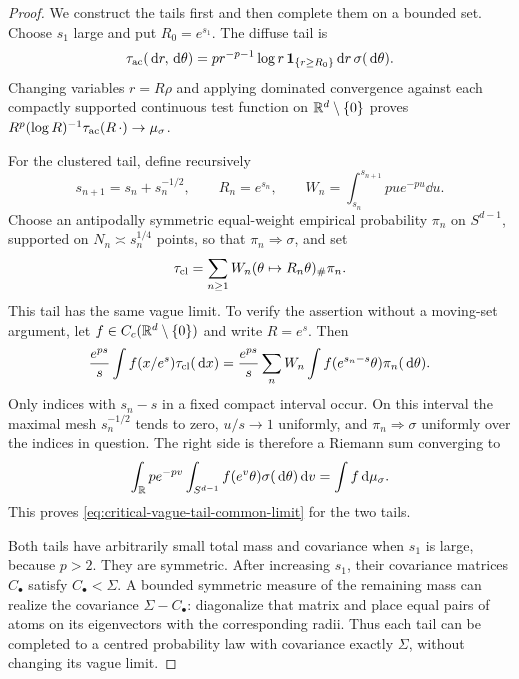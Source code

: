 \begin{proof}
We construct the tails first and then complete them on a bounded set.  Choose
\(s_1\) large and put \(R_0=e^{s_1}\).  The diffuse tail is
\begin{equation}\label{eq:critical-diffuse-tail-definition}
 \tau_{\rm ac}(\,\mathrm{d} r,\,\mathrm{d}\theta)
 =p r^{-p-1}\log r\,\mathbf1_{\{r\ge R_0\}}
   \,\mathrm{d} r\,\sigma(\,\mathrm{d}\theta).
\end{equation}
Changing variables \(r=R\rho\) and applying dominated convergence against
each compactly supported continuous test function on
\(\mathbb{R}^d\setminus\{0\}\) proves
\(R^p(\log R)^{-1}\tau_{\rm ac}(R\,\mathord\cdot)\to\mu_\sigma\).

For the clustered tail, define recursively
\[
 s_{n+1}=s_n+s_n^{-1/2},\qquad R_n=e^{s_n},\qquad
 W_n=\int_{s_n}^{s_{n+1}}pu e^{-pu}\dd u.
\]
Choose an antipodally symmetric equal-weight empirical probability
\(\pi_n\) on \(S^{d-1}\), supported on
\(N_n\asymp s_n^{1/4}\) points, so that \(\pi_n\Rightarrow\sigma\), and set
\begin{equation}\label{eq:critical-clustered-tail-definition}
 \tau_{\rm cl}=\sum_{n\ge1}W_n(\theta\mapsto R_n\theta)_\#\pi_n.
\end{equation}
This tail has the same vague limit.  To verify the assertion without a
moving-set argument, let \(f\in C_c(\mathbb{R}^d\setminus\{0\})\) and write
\(R=e^s\).  Then
\[
 \frac{e^{ps}}s\int f(x/e^s)\tau_{\rm cl}(\,\mathrm{d} x)
 =\frac{e^{ps}}s\sum_nW_n
   \int f(e^{s_n-s}\theta)\pi_n(\,\mathrm{d}\theta).
\]
Only indices with \(s_n-s\) in a fixed compact interval occur.  On this
interval the maximal mesh \(s_n^{-1/2}\) tends to zero, \(u/s\to1\)
uniformly, and \(\pi_n\Rightarrow\sigma\) uniformly over the indices in
question.  The right side is therefore a Riemann sum converging to
\[
 \int_{\mathbb{R}} pe^{-pv}\int_{S^{d-1}}f(e^v\theta)
 \sigma(\,\mathrm{d}\theta)\,\mathrm{d} v
 =\int f\,\mathrm{d}\mu_\sigma.
\]
This proves \eqref{eq:critical-vague-tail-common-limit} for the two tails.

Both tails have arbitrarily small total mass and covariance when \(s_1\) is
large, because \(p>2\).  They are symmetric.  After increasing \(s_1\),
their covariance matrices \(C_\bullet\) satisfy
\(C_\bullet<\Sigma\).  A bounded symmetric measure of the remaining mass
can realize the covariance \(\Sigma-C_\bullet\): diagonalize that matrix
and place equal pairs of atoms on its eigenvectors with the corresponding
radii.  Thus each tail can be completed to a centred probability law with
covariance exactly \(\Sigma\), without changing its vague limit.


\end{proof}
